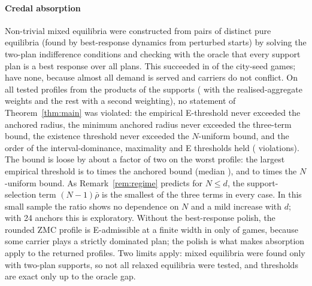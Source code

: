 \documentclass[preprint,12pt]{elsarticle}
\theoremstyle{definition}
\theoremstyle{remark}
\begin{document}
\begin{table}[t]\centering\small
\caption{Theorems on the city games (three seeds). Mixed: seeds with a non-trivial mixed (relaxed) equilibrium. For those seeds (means): $\bar\rho$; the anchored three-term bound of Theorem~\ref{thm:main}(b); the $N$-uniform bound of Theorem~\ref{thm:main}(c); the largest empirical E-threshold over the tested profiles; and the ratio of the latter to the anchored bound. $\Gamma$-maximin (Lemma~\ref{lem:gamma}): drop in the share of demand served from the precise to the surcharge equilibrium at $\delta=0.1$ and $\delta=1$, and the maximality threshold of the surcharge equilibrium divided by $\delta$ at $\delta=1$.}\label{tab:theory}
\end{table}

\paragraph{Credal absorption} Non-trivial mixed equilibria were constructed from pairs of distinct pure equilibria (found by best-response dynamics from perturbed starts) by solving the two-plan indifference conditions and checking with the oracle that every support plan is a best response over all plans. This succeeded in \ThGamesMixed{} of the \ThGamesTotal{} city-seed games; \ThNoMixedCities{} have none, because almost all demand is served and carriers do not conflict. On all \ThProfiles{} tested profiles from the products of the supports (\ThProfilesAgg{} with the realised-aggregate weights and the rest with a second weighting), no statement of Theorem~\ref{thm:main} was violated: the empirical E-threshold never exceeded the anchored radius, the minimum anchored radius never exceeded the three-term bound, the existence threshold never exceeded the $N$-uniform bound, and the order of the interval-dominance, maximality and E thresholds held (\ThViol{} violations). The bound is loose by about a factor of two on the worst profile: the largest empirical threshold is \ThRatioMin{} to \ThRatioMax{} times the anchored bound (median \ThRatioMed), and \ThRatioNMin{} to \ThRatioNMax{} times the $N$-uniform bound. As Remark~\ref{rem:regime} predicts for $N\le d$, the support-selection term $(N-1)\bar\rho$ is the smallest of the three terms in every case. In this small sample the ratio shows no dependence on $N$ and a mild increase with $d$; with 24 anchors this is exploratory. Without the best-response polish, the rounded ZMC profile is E-admissible at a finite width in only \ThZmcFinite{} of \ThZmcN{} games, because some carrier plays a strictly dominated plan; the polish is what makes absorption apply to the returned profiles. Two limits apply: mixed equilibria were found only with two-plan supports, so not all relaxed equilibria were tested, and thresholds are exact only up to the oracle gap.
\end{document}
